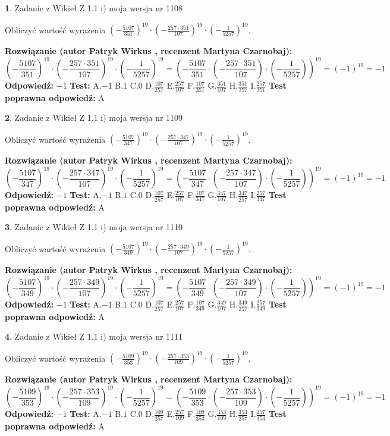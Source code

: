 \documentclass[12pt, a4paper]{article}
\theoremstyle{definition} %
\newtheorem{zad}{}
\newcommand{\zadStart}[1]{\begin{zad}#1\newline}
\newcommand{\zadStop}{\end{zad}}
\newcommand{\rozwStart}[2]{\noindent \textbf{Rozwiązanie (autor #1 , recenzent #2): }\newline}
\newcommand{\rozwStop}{\newline}
\newcommand{\odpStart}{\noindent \textbf{Odpowiedź:}\newline}
\newcommand{\odpStop}{\newline}
\newcommand{\testStart}{\noindent \textbf{Test:}\newline}
\newcommand{\testStop}{\newline}
\newcommand{\kluczStart}{\noindent \textbf{Test poprawna odpowiedź:}\newline}
\newcommand{\kluczStop}{\newline}
\begin{document}
\zadStart{Zadanie z Wikieł Z 1.1 i) moja wersja nr 1108}

Obliczyć wartość wyrażenia $(-\frac{5107}{351})^{19} \cdot (-\frac{257 \cdot 351}{107})^{19} \cdot (-\frac{1}{5257})^{19}$.
\zadStop
\rozwStart{Patryk Wirkus}{Martyna Czarnobaj}
$$(-\frac{5107}{351})^{19} \cdot (-\frac{257 \cdot 351}{107})^{19} \cdot (-\frac{1}{5257})^{19} = (-\frac{5107}{351} \cdot (-\frac{257 \cdot 351}{107}) \cdot (-\frac{1}{5257}))^{19} = (-1)^{19} = -1$$
\rozwStop
\odpStart
$-1$
\odpStop
\testStart
A.$-1$ B.$1$ C.$0$ D.$\frac{107}{257}$ E.$\frac{257}{107}$
F.$\frac{107}{351}$ G.$\frac{351}{107}$
H.$\frac{351}{257}$
I.$\frac{257}{351}$
\testStop
\kluczStart
A
\kluczStop



\zadStart{Zadanie z Wikieł Z 1.1 i) moja wersja nr 1109}

Obliczyć wartość wyrażenia $(-\frac{5107}{347})^{19} \cdot (-\frac{257 \cdot 347}{107})^{19} \cdot (-\frac{1}{5257})^{19}$.
\zadStop
\rozwStart{Patryk Wirkus}{Martyna Czarnobaj}
$$(-\frac{5107}{347})^{19} \cdot (-\frac{257 \cdot 347}{107})^{19} \cdot (-\frac{1}{5257})^{19} = (-\frac{5107}{347} \cdot (-\frac{257 \cdot 347}{107}) \cdot (-\frac{1}{5257}))^{19} = (-1)^{19} = -1$$
\rozwStop
\odpStart
$-1$
\odpStop
\testStart
A.$-1$ B.$1$ C.$0$ D.$\frac{107}{257}$ E.$\frac{257}{107}$
F.$\frac{107}{347}$ G.$\frac{347}{107}$
H.$\frac{347}{257}$
I.$\frac{257}{347}$
\testStop
\kluczStart
A
\kluczStop



\zadStart{Zadanie z Wikieł Z 1.1 i) moja wersja nr 1110}

Obliczyć wartość wyrażenia $(-\frac{5107}{349})^{19} \cdot (-\frac{257 \cdot 349}{107})^{19} \cdot (-\frac{1}{5257})^{19}$.
\zadStop
\rozwStart{Patryk Wirkus}{Martyna Czarnobaj}
$$(-\frac{5107}{349})^{19} \cdot (-\frac{257 \cdot 349}{107})^{19} \cdot (-\frac{1}{5257})^{19} = (-\frac{5107}{349} \cdot (-\frac{257 \cdot 349}{107}) \cdot (-\frac{1}{5257}))^{19} = (-1)^{19} = -1$$
\rozwStop
\odpStart
$-1$
\odpStop
\testStart
A.$-1$ B.$1$ C.$0$ D.$\frac{107}{257}$ E.$\frac{257}{107}$
F.$\frac{107}{349}$ G.$\frac{349}{107}$
H.$\frac{349}{257}$
I.$\frac{257}{349}$
\testStop
\kluczStart
A
\kluczStop



\zadStart{Zadanie z Wikieł Z 1.1 i) moja wersja nr 1111}

Obliczyć wartość wyrażenia $(-\frac{5109}{353})^{19} \cdot (-\frac{257 \cdot 353}{109})^{19} \cdot (-\frac{1}{5257})^{19}$.
\zadStop
\rozwStart{Patryk Wirkus}{Martyna Czarnobaj}
$$(-\frac{5109}{353})^{19} \cdot (-\frac{257 \cdot 353}{109})^{19} \cdot (-\frac{1}{5257})^{19} = (-\frac{5109}{353} \cdot (-\frac{257 \cdot 353}{109}) \cdot (-\frac{1}{5257}))^{19} = (-1)^{19} = -1$$
\rozwStop
\odpStart
$-1$
\odpStop
\testStart
A.$-1$ B.$1$ C.$0$ D.$\frac{109}{257}$ E.$\frac{257}{109}$
F.$\frac{109}{353}$ G.$\frac{353}{109}$
H.$\frac{353}{257}$
I.$\frac{257}{353}$
\testStop
\kluczStart
A
\kluczStop
\end{document}
